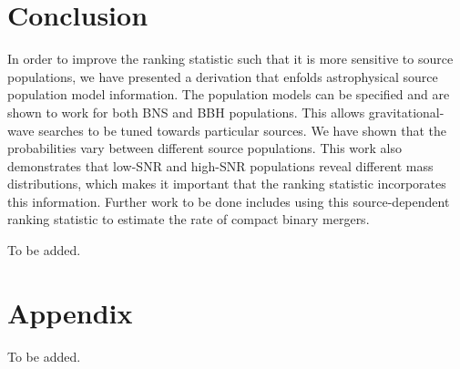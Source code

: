 \documentclass[twocolumn,showpacs,unsortedaddress,superscriptaddress,showkeys,nofootinbib,preprintnumbers,letterpaper]{revtex4-1}
\begin{document}

\section{Conclusion} \label{sec:conclusion}

In order to improve the ranking statistic such that it is more sensitive to source populations, we have presented a derivation that enfolds astrophysical source population model information. The population models can be specified and are shown to work for both BNS and BBH populations. This allows gravitational-wave searches to be tuned towards particular sources. We have shown that the probabilities vary between different source populations. This work also demonstrates that low-SNR and high-SNR populations reveal different mass distributions, which makes it important that the ranking statistic incorporates this information. Further work to be done includes using this source-dependent ranking statistic to estimate the rate of compact binary mergers.

\acknowledgments

To be added.

\appendix

\section{Appendix}
\label{appendix2}

To be added.



\end{document}
